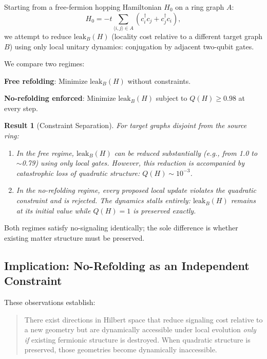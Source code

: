 \documentclass[11pt]{article}
\newtheorem{result}{Result}
\begin{document}
Starting from a free-fermion hopping Hamiltonian $H_0$ on a ring graph $A$:
\begin{equation}
H_0 = -t \sum_{\langle i,j\rangle \in A} \left( c_i^\dagger c_j + c_j^\dagger c_i \right),
\end{equation}
we attempt to reduce $\text{leak}_B(H)$ (locality cost relative to a different target graph $B$) using only local unitary dynamics: conjugation by adjacent two-qubit gates.

We compare two regimes:

\textbf{Free refolding}: Minimize $\text{leak}_B(H)$ without constraints.

\textbf{No-refolding enforced}: Minimize $\text{leak}_B(H)$ subject to $Q(H) \geq 0.98$ at every step.

\begin{result}[Constraint Separation]
For target graphs disjoint from the source ring:
\begin{enumerate}
\item In the \emph{free} regime, $\text{leak}_B(H)$ can be reduced substantially (e.g., from 1.0 to $\sim$0.79) using only local gates. However, this reduction is accompanied by catastrophic loss of quadratic structure: $Q(H) \sim 10^{-3}$.
\item In the \emph{no-refolding} regime, every proposed local update violates the quadratic constraint and is rejected. The dynamics stalls entirely: $\text{leak}_B(H)$ remains at its initial value while $Q(H) = 1$ is preserved exactly.
\end{enumerate}
\end{result}

Both regimes satisfy no-signaling identically; the sole difference is whether existing matter structure must be preserved.

\subsection{Implication: No-Refolding as an Independent Constraint}

These observations establish:

\begin{quote}
There exist directions in Hilbert space that reduce signaling cost relative to a new geometry but are dynamically accessible under local evolution \emph{only if} existing fermionic structure is destroyed. When quadratic structure is preserved, those geometries become dynamically inaccessible.
\end{quote}
\end{document}

